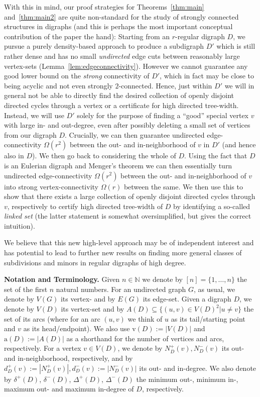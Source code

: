 \documentclass[a4paper,10pt]{article}
\begin{document}
With this in mind, our proof strategies for Theorems~\ref{thm:main} and~\ref{thm:main2} are quite non-standard for the study of strongly connected structures in digraphs (and this is perhaps the most important conceptual contribution of the paper the hand): Starting from an $r$-regular digraph $D$, we pursue a purely density-based approach to produce a subdigraph $D'$ which is still rather dense and has no small \emph{undirected} edge cuts between reasonably large vertex-sets (Lemma~\ref{lem:edgeconnectivity}). However we cannot guarantee any good lower bound on the \emph{strong} connectivity of $D'$, which in fact may be close to being acyclic and not even strongly $2$-connected. Hence, just within $D'$ we will in general not be able to directly find the desired collection of openly disjoint directed cycles through a vertex or a certificate for high directed tree-width. Instead, we will use $D'$ solely for the purpose of finding a ``good'' special vertex $v$ with large in- and out-degree, even after possibly deleting a small set of vertices from our digraph $D$. Crucially, we can then guarantee undirected edge-connectivity $\Omega(r^2)$ between the out- and in-neighborhood of $v$ in $D'$ (and hence also in $D$). We then go back to considering the whole of $D$. Using the fact that $D$ is an Eulerian digraph and Menger's theorem we can then essentially turn undirected edge-connectivity $\Omega(r^2)$ between the out- and in-neighborhood of $v$ into  strong vertex-connectivity $\Omega(r)$ between the same. We then use this to show that there exists a large collection of openly disjoint directed cycles through $v$, respectively to certify high directed tree-width of $D$ by identifying a so-called \emph{linked set} (the latter statement is somewhat oversimplified, but gives the correct intuition). 

We believe that this new high-level approach may be of independent interest and has potential to lead to further new results on finding more general classes of subdivisions and minors in regular digraphs of high degree.

\medskip

\textbf{Notation and Terminology.}
Given $n\in \mathbb{N}$ we denote by $[n]=\{1,\ldots,n\}$ the set of the first $n$ natural numbers. For an undirected graph $G$, as usual, we denote by $V(G)$ its vertex- and by $E(G)$ its edge-set.
Given a digraph $D$, we denote by $V(D)$ its vertex-set and by $A(D)\subseteq \{(u,v)\in V(D)^2|u\neq v\}$ the set of its arcs (where for an arc $(u,v)$ we think of $u$ as its tail/starting point and $v$ as its head/endpoint). We also use $\mathrm{v}(D):=|V(D)|$ and $\mathrm{a}(D):=|A(D)|$ as a shorthand for the number of vertices and arcs, respectively. For a vertex $v\in V(D)$, we denote by $N_D^+(v), N_D^-(v)$ its out- and in-neighborhood, respectively, and by $d_D^+(v):=|N_D^+(v)|, d_D^-(v):=|N_D^-(v)|$ its out- and in-degree. We also denote by $\delta^+(D)$, $\delta^-(D)$, $\Delta^+(D)$, $\Delta^-(D)$ the minimum out-, minimum in-, maximum out- and maximum in-degree of $D$, respectively.
\end{document}
